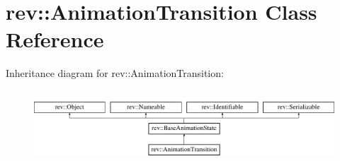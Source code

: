 \hypertarget{classrev_1_1_animation_transition}{}\section{rev\+::Animation\+Transition Class Reference}
\label{classrev_1_1_animation_transition}
Inheritance diagram for rev\+::Animation\+Transition\+:\begin{figure}[H]
\begin{center}
\leavevmode
\includegraphics[height=2.692308cm]{classrev_1_1_animation_transition}
\end{center}
\end{figure}

